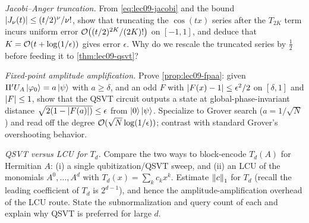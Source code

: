 \begin{exercise}\label{ex:lec09-6}
\emph{Jacobi--Anger truncation.} From \eqref{eq:lec09-jacobi} and the bound
$\left\lvert J_\nu(t) \right\rvert\le(t/2)^\nu/\nu!$, show that truncating the $\cos(tx)$ series after the
$T_{2K}$ term incurs uniform error $\mathcal{O}\bigl((t/2)^{2K}/(2K)!\bigr)$ on $[-1,1]$, and
deduce that $K=\mathcal{O}(t+\log(1/\epsilon))$ gives error $\epsilon$. Why do we rescale the
truncated series by $\tfrac12$ before feeding it to \cref{thm:lec09-qsvt}?
\end{exercise}

\begin{exercise}\label{ex:lec09-7}
\emph{Fixed-point amplitude amplification.} Prove \cref{prop:lec09-fpaa}: given
$\Pi'U_A\ket{\varphi_0}=a\ket\psi$ with $a\ge\delta$, and an odd $F$ with
$\left\lvert F(x)-1 \right\rvert\le\epsilon^2/2$ on $[\delta,1]$ and $\left\lvert F \right\rvert\le1$, show that the QSVT
circuit outputs a state at global-phase-invariant distance
$\sqrt{2(1-\left\lvert F(a) \right\rvert)}\le\epsilon$ from $\ket0\ket\psi$. Specialize to Grover search
($a=1/\sqrt N$) and read off the degree $\mathcal{O}(\sqrt N\log(1/\epsilon))$; contrast with
standard Grover's overshooting behavior.
\end{exercise}

\begin{exercise}\label{ex:lec09-8}
\emph{QSVT versus LCU for $T_d$.} Compare the two ways to block-encode $T_d(A)$ for
Hermitian $A$: (i) a single qubitization/QSVT sweep, and (ii) an LCU of the monomials
$A^0,\dots,A^d$ with $T_d(x)=\sum_k c_k x^k$. Estimate $\left\lVert c \right\rVert_1$ for $T_d$ (recall the
leading coefficient of $T_d$ is $2^{d-1}$), and hence the amplitude-amplification
overhead of the LCU route. State the subnormalization and query count of each and
explain why QSVT is preferred for large $d$.
\end{exercise}

